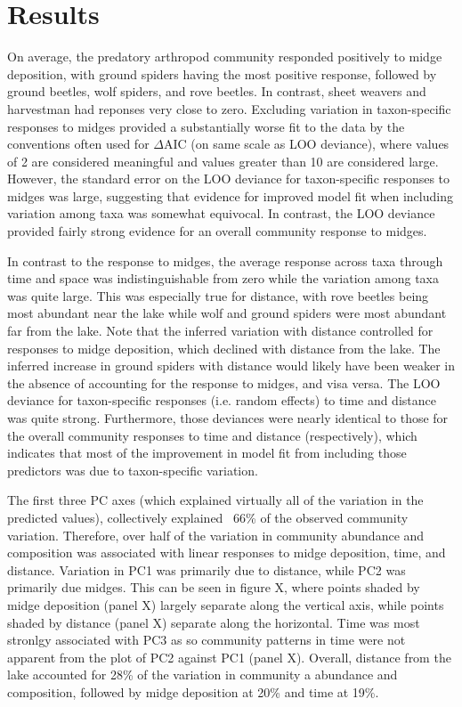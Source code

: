 

\section*{Results}

On average, the predatory arthropod community responded positively to midge deposition,
with ground spiders having the most positive
response, followed by ground beetles, wolf spiders, and rove beetles.
In contrast, sheet  weavers and harvestman had reponses very close to zero.
Excluding variation in taxon-specific responses to midges provided a substantially
worse fit to the data by the conventions often used for $\Delta$AIC
(on same scale as LOO deviance), where values of 2 are considered meaningful and values
greater than 10 are considered large.
However, the standard error on the LOO deviance for taxon-specific responses to midges was
large, suggesting that evidence for improved model fit when including variation among
taxa was somewhat equivocal.
In contrast, the LOO deviance provided fairly strong evidence for an overall
community response to midges.

In contrast to the response to midges, the average response across taxa through
time and space was indistinguishable from zero while the variation among taxa was
quite large.
This was especially true for distance, with rove beetles being most abundant near
the lake while wolf and ground spiders were most abundant far from the lake.
Note that the inferred variation with distance controlled for responses to midge
deposition, which declined with distance from the lake.
The inferred increase in ground spiders with distance
would likely have been weaker in the absence of accounting for the response to midges,
and visa versa.
The LOO deviance for taxon-specific responses (i.e. random effects) to time and
distance was quite strong.
Furthermore, those deviances were nearly identical to those for the overall community
responses to time and distance (respectively), which indicates that most of the
improvement in model fit from including those predictors was due to taxon-specific
variation.

The first three PC axes (which explained virtually all of the variation in the
predicted values), collectively explained ~66\% of the observed community variation.
Therefore, over half of the variation in community abundance and composition was
associated with linear responses to midge deposition, time, and distance.
Variation in PC1 was primarily due to distance, while PC2 was primarily due midges.
This can be seen in figure X, where points shaded by midge deposition (panel X)
largely separate along the vertical axis, while points shaded by distance (panel X)
separate along the horizontal.
Time was most stronlgy associated with PC3 as so community patterns in time were
not apparent from the plot of PC2 against PC1 (panel X).
Overall, distance from the lake accounted for 28\% of the variation in community a
abundance and composition, followed by midge deposition at 20\% and time at 19\%.


